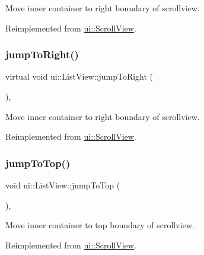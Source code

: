 Move inner container to right boundary of scrollview. 

Reimplemented from \hyperlink{classui_1_1ScrollView_ade536205c63207b9efdf6d2dac9631ae}{ui\+::\+Scroll\+View}.

\mbox{\label{classui_1_1ListView_aca7e4b44da940fdab188d7b713ada04a}} 
\subsubsection{\texorpdfstring{jump\+To\+Right()}{jumpToRight()}\hspace{0.1cm}{\footnotesize\ttfamily [2/2]}}
{\footnotesize\ttfamily virtual void ui\+::\+List\+View\+::jump\+To\+Right (\begin{DoxyParamCaption}{ }\end{DoxyParamCaption})\hspace{0.3cm}{\ttfamily [override]}, {\ttfamily [virtual]}}

Move inner container to right boundary of scrollview. 

Reimplemented from \hyperlink{classui_1_1ScrollView_ade536205c63207b9efdf6d2dac9631ae}{ui\+::\+Scroll\+View}.

\mbox{\label{classui_1_1ListView_af3477294f3fc87bbc9aaa1bec3c86fd8}} 
\subsubsection{\texorpdfstring{jump\+To\+Top()}{jumpToTop()}\hspace{0.1cm}{\footnotesize\ttfamily [1/2]}}
{\footnotesize\ttfamily void ui\+::\+List\+View\+::jump\+To\+Top (\begin{DoxyParamCaption}{ }\end{DoxyParamCaption})\hspace{0.3cm}{\ttfamily [override]}, {\ttfamily [virtual]}}

Move inner container to top boundary of scrollview. 

Reimplemented from \hyperlink{classui_1_1ScrollView_abdc304338a86f1fd0cea613fca25ffef}{ui\+::\+Scroll\+View}.

